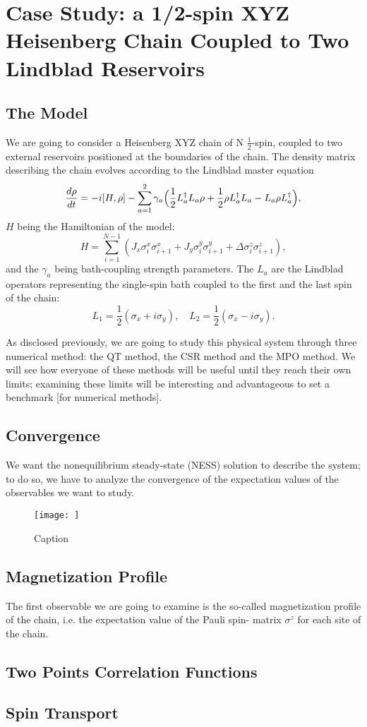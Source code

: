 \chapter{Case Study: a 1/2-spin XYZ Heisenberg Chain Coupled to Two Lindblad Reservoirs}
\label{Chapter3}

\section{The Model}
We are going to consider a Heisenberg XYZ chain of N $\frac{1}{2}$-spin, coupled to two external reservoirs positioned at the boundaries of the chain. The density matrix describing the chain evolves according to the Lindblad master equation
\begin{equation}
    \frac{d\rho}{dt} = -i[H, \rho] - \sum_{a=1}^{2}\gamma_a\Bigl(\frac{1}{2}L_a^{\dagger}L_a\rho + \frac{1}{2}\rho L_a^{\dagger}L_a - L_a\rho L_a^{\dagger}\Bigl),
\end{equation}
$H$ being the Hamiltonian of the model:
\begin{equation}
\label{ham_chain}
    H = \sum_{i = 1}^{N-1} (J_x \sigma_i^x \sigma_{i+1}^x + J_y \sigma_i^y \sigma_{i+1}^y + \Delta \sigma_i^z \sigma_{i+1}^z),
\end{equation}
and the $\gamma_a$ being bath-coupling strength parameters. The $L_a$ are the Lindblad operators representing the single-spin bath coupled to the first and the last spin of the chain:
\begin{equation}
    L_1 = \frac{1}{2}(\sigma_x + i\sigma_y), \quad L_2 = \frac{1}{2}(\sigma_x - i\sigma_y).
\end{equation}

As disclosed previously, we are going to study this physical system through three numerical method: the QT method, the CSR method and the MPO method. We will see how everyone of these methods will be useful until they reach their own limits; examining these limits will be interesting and advantageous to set a benchmark [for numerical methods].

\section{Convergence}
We want the nonequilibrium steady-state (NESS) solution to describe the system; to do so, we have to analyze the convergence of the expectation values of the observables we want to study. 

\begin{figure}
    \centering
    \texttt{[image: ]}
    \caption{Caption}
    \label{fig:my_label}
\end{figure}

\section{Magnetization Profile}
The first observable we are going to examine is the so-called magnetization profile of the chain, i.e. the expectation value of the Pauli spin- matrix $\sigma^z$ for each site of the chain. 

\section{Two Points Correlation Functions}

\section{Spin Transport}
